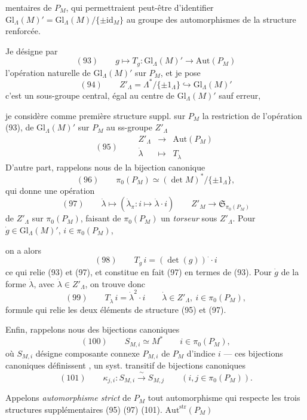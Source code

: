 \documentclass[11pt,a4paper]{article}
\begin{document}

mentaires de $P_M$, qui permettraient peut-être d'identifier $\mathrm{Gl}_\Lambda(M)' = \mathrm{Gl}_\Lambda(M)/\{\pm \mathrm{id}_M\}$ au groupe des automorphismes de la structure renforcée.

Je désigne par
\[
(93)\qquad g \longmapsto T_g : \mathrm{Gl}_\Lambda(M)' \longrightarrow \mathrm{Aut}(P_M)
\]
l'opération naturelle de $\mathrm{Gl}_\Lambda(M)'$ sur $P_M$, et je  pose
\[
(94)\qquad Z'_\Lambda = \Lambda^{*}/\{\pm 1_\Lambda\} \hookrightarrow \mathrm{Gl}_\Lambda(M)'
\]
c'est un sous-groupe central, égal au centre de $\mathrm{Gl}_\Lambda(M)'$ sauf erreur,

je considère comme première structure suppl. sur $P_M$ la restriction de l'opération (93), de $\mathrm{Gl}_\Lambda(M)'$ sur $P_M$ au ss-groupe $Z'_\Lambda$
\[
(95)\qquad
\begin{array}{rcl}
Z'_\Lambda & \longrightarrow & \mathrm{Aut}(P_M) \\
\dot\lambda & \longmapsto & T_{\dot\lambda}
\end{array}
\]
D'autre part,  rappelons nous de la bijection canonique
\[
(96)\qquad \pi_0(P_M) \simeq (\det M)^{*}/\{\pm 1_\Lambda\} ,
\]
qui donne une opération
\[
(97)\qquad \dot\lambda \longmapsto (\dot\lambda_\pi : i \longmapsto \dot\lambda \cdot i) \qquad Z'_M \longrightarrow \mathfrak{S}_{\pi_0(P_M)}
\]
de $Z'_\Lambda$ sur $\pi_0(P_M)$, faisant de $\pi_0(P_M)$ un \emph{torseur} sous $Z'_\Lambda$. Pour $\dot g \in \mathrm{Gl}_\Lambda(M)'$, $i \in \pi_0(P_M)$,

on a alors
\[
(98)\qquad T_{\dot g}\, i = (\det(g))^{\cdot} \cdot i
\]
ce qui relie (93) et (97), et constitue en fait (97) en termes de (93). Pour $\dot g$ de la forme $\dot\lambda$, avec $\dot\lambda \in Z'_\Lambda$, on trouve donc
\[
(99)\qquad T_{\dot\lambda}\, i = \dot\lambda^2 \cdot i \qquad \dot\lambda \in Z'_\Lambda, \ i \in \pi_0(P_M) ,
\]
formule qui relie les deux éléments de structure (95) et (97).

Enfin, rappelons nous des bijections canoniques
\[
(100)\qquad S_{M,i} \simeq M^{*} \qquad i \in \pi_0(P_M) ,
\]
où $S_{M,i}$ désigne   composante connexe $P_{M,i}$ de $P_M$ d'indice $i$ --- ces bijections canoniques définissent \struck{\ill{}}, un syst. transitif de bijections canoniques
\[
(101)\qquad \kappa_{j,i} : S_{M,i} \xrightarrow{\ \sim\ } S_{M,j} \qquad (i, j \in \pi_0(P_M)) .
\]

Appelons \emph{automorphisme strict} de $P_M$ tout automorphisme   qui respecte les trois structures supplémentaires (95) (97) (101).  $\mathrm{Aut}^{\mathrm{str}}(P_M)$


\end{document}
